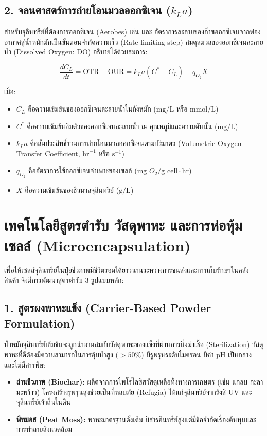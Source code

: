 \subsection{2. จลนศาสตร์การถ่ายโอนมวลออกซิเจน (\texorpdfstring{$k_L a$}{kLa})}
สำหรับจุลินทรีย์ที่ต้องการออกซิเจน (Aerobes) เช่น  และ  อัตราการละลายของก๊าซออกซิเจนจากฟองอากาศสู่น้ำหมักมักเป็นขั้นตอนจำกัดความเร็ว (Rate-limiting step) สมดุลมวลของออกซิเจนละลายน้ำ (Dissolved Oxygen: DO) อธิบายได้ด้วยสมการ:

\begin{equation}
\frac{dC_L}{dt} = \text{OTR} - \text{OUR} = k_L a (C^* - C_L) - q_{O_2} X
\end{equation}

เมื่อ:
\begin{itemize}
    \item $C_L$ คือความเข้มข้นของออกซิเจนละลายน้ำในถังหมัก ($\text{mg/L}$ หรือ $\text{mmol/L}$)
    \item $C^*$ คือความเข้มข้นอิ่มตัวของออกซิเจนละลายน้ำ ณ อุณหภูมิและความดันนั้น ($\text{mg/L}$)
    \item $k_L a$ คือสัมประสิทธิ์รวมการถ่ายโอนมวลออกซิเจนตามปริมาตร (Volumetric Oxygen Transfer Coefficient, $\text{hr}^{-1}$ หรือ $\text{s}^{-1}$)
    \item $q_{O_2}$ คืออัตราการใช้ออกซิเจนจำเพาะของเซลล์ ($\text{mg } O_2/\text{g cell}\cdot\text{hr}$)
    \item $X$ คือความเข้มข้นของชีวมวลจุลินทรีย์ ($\text{g/L}$)
\end{itemize}

\section{เทคโนโลยีสูตรตำรับ วัสดุพาหะ และการห่อหุ้มเซลล์ (Microencapsulation)}

เพื่อให้เซลล์จุลินทรีย์ในปุ๋ยชีวภาพมีชีวิตรอดได้ยาวนานระหว่างการขนส่งและการเก็บรักษาในคลังสินค้า จึงมีการพัฒนาสูตรตำรับ 3 รูปแบบหลัก:

\subsection{1. สูตรผงพาหะแข็ง (Carrier-Based Powder Formulation)}
น้ำหมักจุลินทรีย์เข้มข้นจะถูกนำมาผสมกับวัสดุพาหะของแข็งที่ผ่านการนึ่งฆ่าเชื้อ (Sterilization) วัสดุพาหะที่ดีต้องมีความสามารถในการอุ้มน้ำสูง ($> 50\%$) มีรูพรุนระดับไมครอน มีค่า pH เป็นกลาง และไม่มีสารพิษ:
\begin{itemize}
    \item \textbf{ถ่านชีวภาพ (Biochar):} ผลิตจากการไพโรไลซิสวัสดุเหลือทิ้งทางการเกษตร (เช่น แกลบ กะลา มะพร้าว) โครงสร้างรูพรุนสูงช่วยเป็นที่หลบภัย (Refugia) ให้แก่จุลินทรีย์จากรังสี UV และจุลินทรีย์เจ้าถิ่นในดิน
    \item \textbf{พีทมอส (Peat Moss):} พาหะมาตรฐานดั้งเดิม มีสารอินทรีย์สูงแต่มีข้อจำกัดเรื่องต้นทุนและการทำลายสิ่งแวดล้อม
\end{itemize}


